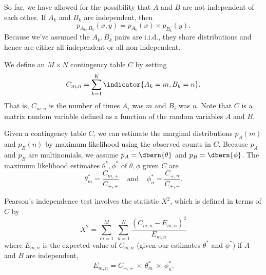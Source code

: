 So far, we have allowed for the possibility that $A$ and $B$ are not
independent of each other.  If $A_k$ and $B_k$ are independent, then
%
\begin{equation}
p\!_{A_k,B_k}(x,y) = p\!_{A_k}(x) \times p_{B_k}(y).
\end{equation}
%
Because we've assumed the $A_k,B_k$ pairs are i.i.d., they share
distributions and hence are either all independent or all
non-independent.

We define an $M \times N$ contingency table $C$ by setting
%
\begin{equation}
C_{m,n} = \sum_{k=1}^K \indicator{A_k = m, B_k = n}.
\end{equation}
%
That is, $C_{m,n}$ is the number of times $A_i$ was $m$ and $B_i$ was
$n$.  Note that $C$ is a matrix random variable defined as a function
of the random variables $A$ and $B$.

Given a contingency table $C$, we can estimate the marginal
distributions $p_A(m)$ and $p_B(n)$ by maximum likelihood using the
observed counts in $C$.  Because $p_A$ and $p_B$ are multinomials, we
assume $p_A = \dbern{\theta}$ and $p_B = \dbern{\phi}$.  The
maximum likelihood estimates $\theta^*, \phi^*$ of $\theta,\phi$
given $C$ are
%
\begin{equation}
\theta^*_m = \frac{C_{m,+}}{C_{+,+}} 
\ \ \ \ \ \mbox{and} \ \ \ \ \ 
\phi^*_n = \frac{C_{+,n}}{C_{+,+}}.
\end{equation}

Pearson's independence test involves the statistic $X^2$, which is
defined in terms of $C$ by
%
\begin{equation}
X^2 
= \sum_{m=1}^M \ \sum_{n=1}^N 
  \frac{(C_{m,n} - E_{m,n})^2}
       {E_{m,n}}
\end{equation}
%
where $E_{m,n}$ is the expected value of $C_{m,n}$ (given our
estimates $\theta^*$ and $\phi^*$) if $A$ and $B$ are independent,
%
\begin{equation}
E_{m,n} = C_{+,+} \ \times \ \theta^*_m \ \times \ \phi^*_n.
\end{equation}

